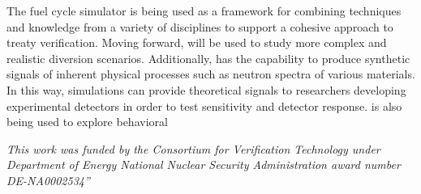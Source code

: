 The \Cyclus fuel cycle simulator is being used as a framework for combining techniques and knowledge from a variety of disciplines to support a cohesive approach to treaty verification.  Moving forward, \Cyclus will be used to study more complex and realistic diversion scenarios.  Additionally, \Cyclus has the capability to produce synthetic signals of inherent physical processes such as neutron spectra of various materials.  In this way, \Cyclus simulations can provide theoretical signals to researchers developing experimental detectors in order to test sensitivity and detector response.  \Cyclus is also being used to explore behavioral 

\textit{This work was funded by the Consortium for Verification Technology under Department of Energy National Nuclear Security Administration award number DE-NA0002534”}
